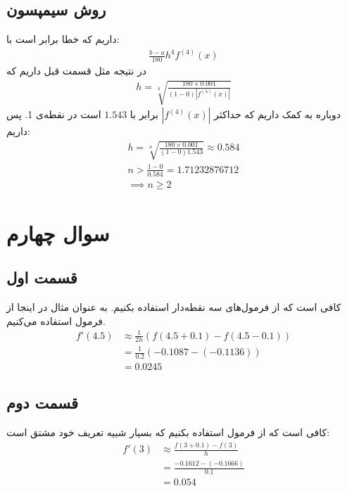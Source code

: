\documentclass[]{article}
\begin{document}
\subsection*{روش سیمپسون}
داریم که خطا برابر است با:
\begin{gather*}
    \frac{b - a}{180}h^4 f^{(4)}(x)
\end{gather*}
در نتیجه مثل قسمت قبل داریم که
\begin{gather*}
    h = \sqrt[4]{\frac{180 \times 0.001}{(1 - 0) |f^{(4)}(x)|}}
\end{gather*}
دوباره به کمک
داریم که حداکثر
$|f^{(4)}(x)|$
برابر با
$1.543$
است در نقطه‌ی 1. پس داریم:
\begin{gather*}
    h = \sqrt[4]{\frac{180 \times 0.001}{(1 - 0) 1.543}} \approx 0.584\\
    n > \frac{1 - 0}{0.584} = 1.71232876712\\
    \implies \boxed{n \ge 2}
\end{gather*}
\section*{سوال چهارم}
\subsection*{قسمت اول}
کافی است که از فرمول‌های سه نقطه‌دار استفاده بکنیم. به عنوان مثال در اینجا از فرمول
استفاده می‌کنیم.
\begin{align*}
    f'(4.5) &\approx \frac{1}{2h} (f(4.5 + 0.1) - f(4.5 - 0.1))\\
    &=\frac{1}{0.2} (-0.1087 - (-0.1136))\\
    &=\boxed{0.0245}
\end{align*}
\subsection*{قسمت دوم}
کافی است که از فرمول
استفاده بکنیم که بسیار شبیه تعریف خود مشتق است:
\begin{align*}
    f'(3) &\approx \frac{f(3 + 0.1) - f(3)}{h}\\
    &=\frac{-0.1612 - (-0.1666)}{0.1}\\
    &=\boxed{0.054}
\end{align*}
\end{document}
